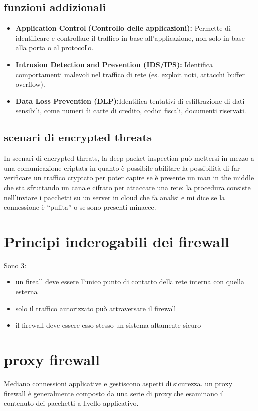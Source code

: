 \documentclass{report}
\begin{document}
\subsection{funzioni addizionali}
\begin{itemize}
    \item \textbf{Application Control (Controllo delle applicazioni):} Permette di identificare e controllare il traffico in base all'applicazione, non solo in base alla porta o al protocollo.
    \item \textbf{Intrusion Detection and Prevention (IDS/IPS):} Identifica comportamenti malevoli nel traffico di rete (es. exploit noti, attacchi buffer overflow).
    \item \textbf{Data Loss Prevention (DLP):}Identifica tentativi di esfiltrazione di dati sensibili, come numeri di carte di credito, codici fiscali, documenti riservati.
\end{itemize}

\subsection{scenari di encrypted threats}
In scenari di encrypted threats, la deep packet inspection può mettersi in mezzo a una comunicazione criptata in quanto è possibile abilitare la possibilità di far verificare un traffico cryptato per poter capire se è presente un man in the 
middle che sta sfruttando un canale cifrato per attaccare una rete: la procedura consiste nell'inviare i pacchetti su un server in cloud che fa analisi e mi dice se la connessione è “pulita” o se sono presenti minacce. 

\section{Principi inderogabili dei firewall}
Sono 3:
\begin{itemize}
    \item un fireall deve essere l'unico punto di contatto della rete interna con quella esterna
    \item solo il traffico autorizzato può attraversare il firewall
    \item il firewall deve essere esso stesso un sistema altamente sicuro
\end{itemize}

\section{proxy firewall}
Mediano connessioni applicative e gestiscono aspetti di sicurezza.
un proxy firewall è generalmente composto da una serie di proxy che esaminano il contenuto dei
pacchetti a livello applicativo.
\end{document}
